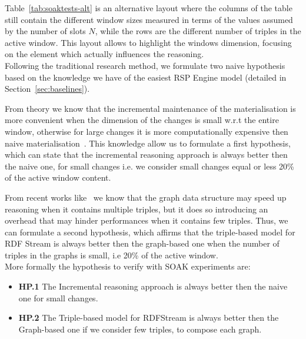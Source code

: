 Table~\ref{tab:soaktests-alt} is an alternative layout where the columns of the table still contain the different window sizes measured in terms of the values assumed by the number of slots $N$, while the rows are the different number of triples in the active window. This layout allows to highlight the windows dimension, focusing on the element which actually influences the reasoning.\\

\noindent Following the traditional research method, we formulate two naive hypothesis based on the knowledge we have of the easiest RSP Engine model (detailed in Section~\ref{sec:baselines}). 

From theory we know that the incremental maintenance of the materialisation is more convenient when the dimension of the changes is small w.r.t the entire window, otherwise  for large changes it is more computationally expensive then  naive materialisation~\cite{DellAglio2014,DBLP:conf/cikm/RenP11,DBLP:conf/semweb/UrbaniMJHB13}.
This knowledge allow us to formulate a first hypothesis, which can state that the incremental reasoning approach is always better then the naive one, for small changes i.e. we consider small changes equal or less 20\% of the active window content.

From recent works like~\cite{DBLP:conf/semweb/BalduiniVDTPC13} we know that the graph data structure may speed up reasoning when it contains multiple triples, but it does so introducing an overhead that may hinder performances when it contains few triples. Thus, we can formulate a second hypothesis, which affirms that the triple-based model for RDF Stream is always better then the graph-based one when the number of triples in the graphs is small, i.e 20\% of the active window.\\

More formally the hypothesis to verify with SOAK experiments are:
\begin{itemize}
\item \textbf{HP.1} The Incremental reasoning approach is always better then the naive one for small changes.
\item \textbf{HP.2} The Triple-based model for RDFStream is always better then the Graph-based one if we consider few triples, to compose each graph.
\end{itemize}


